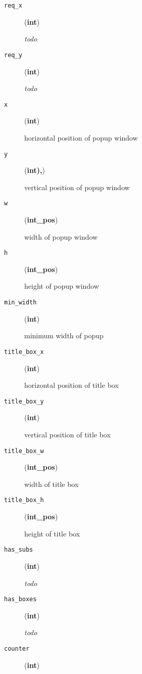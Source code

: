 \begin{description}
\item[{\texttt{req\_x}}] \leavevmode (\textbf{int})

\emph{todo}

\item[{\texttt{req\_y}}] \leavevmode (\textbf{int})

\emph{todo}

\item[{\texttt{x}}] \leavevmode (\textbf{int})

horizontal position of popup window

\item[{\texttt{y}}] \leavevmode (\textbf{int),})

vertical position of popup window

\item[{\texttt{w}}] \leavevmode (\textbf{int\_pos})

width of popup window

\item[{\texttt{h}}] \leavevmode (\textbf{int\_pos})

height of popup window

\item[{\texttt{min\_width}}] \leavevmode (\textbf{int})

minimum width of popup

\item[{\texttt{title\_box\_x}}] \leavevmode (\textbf{int})

horizontal position of title box

\item[{\texttt{title\_box\_y}}] \leavevmode (\textbf{int})

vertical position of title box

\item[{\texttt{title\_box\_w}}] \leavevmode (\textbf{int\_pos})

width of title box

\item[{\texttt{title\_box\_h}}] \leavevmode (\textbf{int\_pos})

height of title box

\item[{\texttt{has\_subs}}] \leavevmode (\textbf{int})

\emph{todo}

\item[{\texttt{has\_boxes}}] \leavevmode (\textbf{int})

\emph{todo}

\item[{\texttt{counter}}] \leavevmode (\textbf{int})


\end{description}
